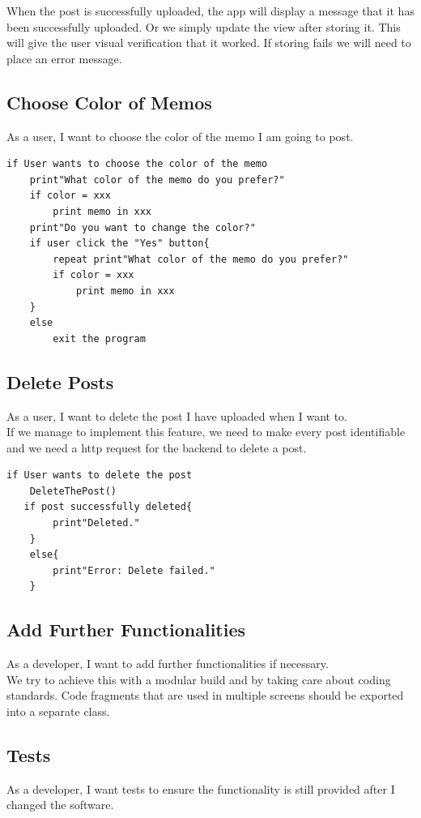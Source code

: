 \documentclass[conference]{IEEEtran}
\numberwithin{figure}{subsection}
\begin{document}
When the post is successfully uploaded, the app will display a message that it has been successfully uploaded. Or we simply update the view after storing it. This will give the user visual verification that it worked. If storing fails we will need to place an error message.

\subsection{Choose Color of Memos}
As a user, I want to choose the color of the memo I am going to post.\\
\begin{lstlisting}
if User wants to choose the color of the memo
	print"What color of the memo do you prefer?"
	if color = xxx
		print memo in xxx
    print"Do you want to change the color?"
    if user click the "Yes" button{
    	repeat print"What color of the memo do you prefer?"
   		if color = xxx
    		print memo in xxx
    }
    else 
    	exit the program
\end{lstlisting}

\subsection{Delete Posts}
As a user, I want to delete the post I have uploaded when I want to. \\

If we manage to implement this feature, we need to make every post identifiable and we need a http request for the backend to delete a post.
\begin{lstlisting}
if User wants to delete the post
	DeleteThePost()
   if post successfully deleted{
		print"Deleted."
	}
	else{
		print"Error: Delete failed."
	}
\end{lstlisting}

\subsection{Add Further Functionalities}
As a developer, I want to add further functionalities if necessary.\\

We try to achieve this with a modular build and by taking care about coding standards. Code fragments that are used in multiple screens should be exported into a separate class.

\subsection{Tests}
As a developer, I want tests to ensure the functionality is still provided after I changed the software.\\
\end{document}
